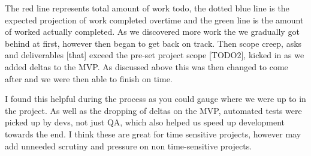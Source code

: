   The red line represents total amount of work todo, the dotted blue line is the expected projection of work completed overtime and the green line 
  is the amount of worked actually completed. As we discovered more work the we gradually got behind at first, however then began to get back 
  on track. Then scope creep, asks and deliverables [that] exceed the pre-set project scope [TODO2], kicked in as we added deltas to the MVP. As discussed 
  above this was then changed to come after and we were then able to finish on time.

  I found this helpful during the process as you could gauge where we were up to in the project. As well as the dropping of deltas on the MVP, automated 
  tests were picked up by devs, not just QA, which also helped us speed up development towards the end. I think these are great for time sensitive
  projects, however may add unneeded scrutiny and pressure on non time-sensitive projects.

  \newpage
